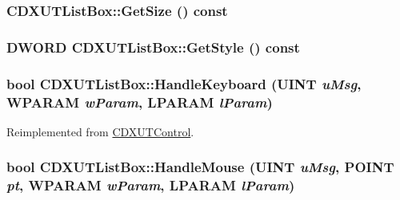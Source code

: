 \hypertarget{class_c_d_x_u_t_list_box_ac29427369066a473e35fb33795275e15}{
\subsubsection[{GetSize}]{ CDXUTListBox::GetSize () const}}
\label{class_c_d_x_u_t_list_box_ac29427369066a473e35fb33795275e15}
\hypertarget{class_c_d_x_u_t_list_box_a11e88f4e848a524086c1f1f7767ef1f2}{
\subsubsection[{GetStyle}]{\setlength{\rightskip}{0pt plus 5cm}DWORD CDXUTListBox::GetStyle () const}}
\label{class_c_d_x_u_t_list_box_a11e88f4e848a524086c1f1f7767ef1f2}
\hypertarget{class_c_d_x_u_t_list_box_a20b2dc81c2af1206a21b19f46f8300a4}{
\subsubsection[{HandleKeyboard}]{\setlength{\rightskip}{0pt plus 5cm}bool CDXUTListBox::HandleKeyboard (UINT {\em uMsg}, \/  WPARAM {\em wParam}, \/  LPARAM {\em lParam})}}
\label{class_c_d_x_u_t_list_box_a20b2dc81c2af1206a21b19f46f8300a4}


Reimplemented from \hyperlink{class_c_d_x_u_t_control_a94044e608adeac7c329d83cf63587dcf}{CDXUTControl}.\hypertarget{class_c_d_x_u_t_list_box_a7d184abbad5688513f0fb25d6a37528f}{
\subsubsection[{HandleMouse}]{\setlength{\rightskip}{0pt plus 5cm}bool CDXUTListBox::HandleMouse (UINT {\em uMsg}, \/  POINT {\em pt}, \/  WPARAM {\em wParam}, \/  LPARAM {\em lParam})}}
\label{class_c_d_x_u_t_list_box_a7d184abbad5688513f0fb25d6a37528f}


